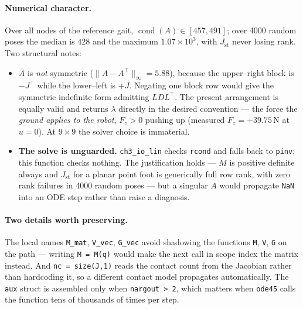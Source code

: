 \documentclass[11pt,a4paper]{article}
\newcommand{\code}[1]{\texttt{#1}}          %
\newcommand{\warn}[1]{\textcolor{red!70!black}{\textbf{#1}}}
\begin{document}
\paragraph{Numerical character.}
Over all nodes of the reference gait, $\operatorname{cond}(A)\in[457,491]$; over
4000 random poses the median is $428$ and the maximum $1.07\times10^{3}$, with
$J_{\mathrm{st}}$ never losing rank. Two structural notes:
\begin{itemize}
  \item $A$ is \emph{not} symmetric ($\lVert A-A^{\top}\rVert_\infty = 5.88$),
        because the upper--right block is $-J^{\top}$ while the lower--left is
        $+J$. Negating one block row would give the symmetric indefinite form
        admitting $LDL^{\top}$. The present arrangement is equally valid and
        returns $\lambda$ directly in the desired convention --- the force the
        \emph{ground applies to the robot}, $F_z>0$ pushing up (measured
        $F_z = +39.75\,$N at $u=0$). At $9\times9$ the solver choice is
        immaterial.
  \item \warn{The solve is unguarded.} \code{ch3\_io\_lin} checks \code{rcond}
        and falls back to \code{pinv}; this function checks nothing. The
        justification holds --- $M$ is positive definite always and
        $J_{\mathrm{st}}$ for a planar point foot is generically full row rank,
        with zero rank failures in 4000 random poses --- but a singular $A$ would
        propagate \code{NaN} into an ODE step rather than raise a diagnosis.
\end{itemize}

\paragraph{Two details worth preserving.}
The local names \code{M\_mat}, \code{V\_vec}, \code{G\_vec} avoid shadowing the
functions \code{M}, \code{V}, \code{G} on the path --- writing \code{M = M(q)}
would make the next call in scope index the matrix instead. And
\code{nc = size(J,1)} reads the contact count from the Jacobian rather than
hardcoding it, so a different contact model propagates automatically. The
\code{aux} struct is assembled only when \code{nargout > 2}, which matters when
\code{ode45} calls the function tens of thousands of times per step.

\end{document}
